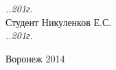 \begin{titlepage}
\begin{flushleft}
{\it\underline{\hspace{10mm}}.\underline{\hspace{10mm}}.201\underline{\hspace{5mm}}г.}\\
Студент \hspace{13mm}\underline{\hspace{30mm}} Никуленков Е.С. \\
{\it\underline{\hspace{10mm}}.\underline{\hspace{10mm}}.201\underline{\hspace{5mm}}г.}\\
\end{flushleft}
\vspace{15mm}
\begin{center}
Воронеж 2014
\end{center}
\end{titlepage}

\newpage
\setcounter{page}{2}
